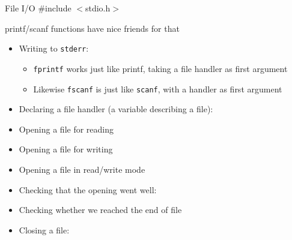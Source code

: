 \begin{Coupe}
\begin{frame}{File I/O}
  \#include $<$stdio.h$>$
  \begin{block}{printf/scanf functions have nice friends for that}
    \begin{itemize}
    \item Writing to \texttt{stderr}:
      \begin{itemize}
      \item \texttt{fprintf} works just like printf, taking a file handler as first
        argument
      \item Likewise \texttt{fscanf} is just like \texttt{scanf}, with a
        handler as first argument
      \end{itemize}

    \item Declaring a file handler (a variable describing a file): 
    \item Opening a file for reading 
    \item Opening a file for writing 
    \item Opening a file in read/write mode 
    \item Checking that the opening went well: 
    \item Checking whether we reached the end of file 
    \item Closing a file:   
    \end{itemize}
  \end{block}
\end{frame}


\end{Coupe}
